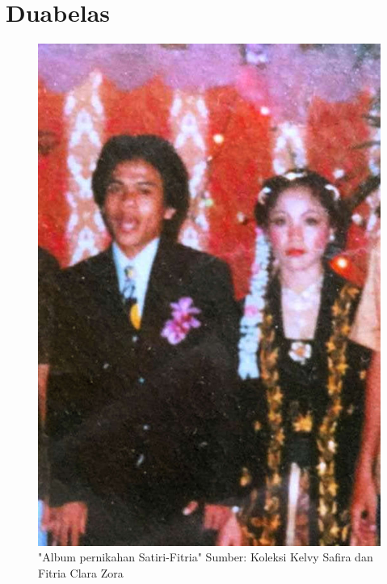 
\chapter{Duabelas}

\begin{figure}[htbp]
\centerline{\includegraphics[scale=1.0]{01-12-01}}
\caption{"Album pernikahan Satiri-Fitria" Sumber: Koleksi Kelvy Safira dan Fitria Clara Zora}
\label{01-12-01}
\end{figure}
%

